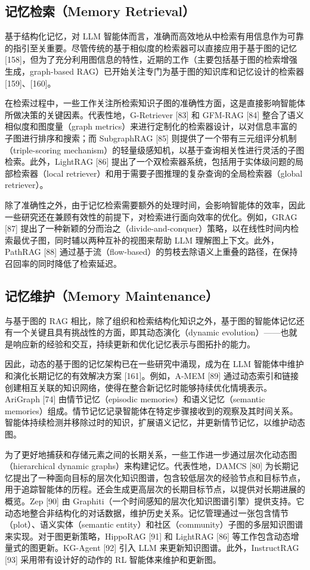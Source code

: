 \documentclass[10pt,UTF8,fontset=fandol]{ctexart}
\begin{document}
\subsection{记忆检索（Memory Retrieval）}

基于结构化记忆，对 LLM 智能体而言，准确而高效地从中检索有用信息作为可靠的指引至关重要。尽管传统的基于相似度的检索器可以直接应用于基于图的记忆 [158]，但为了充分利用图信息的特性，近期的工作（主要包括基于图的检索增强生成，graph-based RAG）已开始关注专门为基于图的知识库和记忆设计的检索器 [159]、[160]。

在检索过程中，一些工作关注所检索知识子图的准确性方面，这是直接影响智能体所做决策的关键因素。代表性地，G-Retriever [83] 和 GFM-RAG [84] 整合了语义相似度和图度量（graph metrics）来进行定制化的检索器设计，以对信息丰富的子图进行排序和搜索；而 SubgraphRAG [85] 则提供了一个带有三元组评分机制（triple-scoring mechanism）的轻量级感知机，以基于查询相关性进行灵活的子图检索。此外，LightRAG [86] 提出了一个双检索器系统，包括用于实体级问题的局部检索器（local retriever）和用于需要子图推理的复杂查询的全局检索器（global retriever）。

除了准确性之外，由于记忆检索需要额外的处理时间，会影响智能体的效率，因此一些研究还在兼顾有效性的前提下，对检索进行面向效率的优化。例如，GRAG [87] 提出了一种新颖的分而治之（divide-and-conquer）策略，以在线性时间内检索最优子图，同时辅以两种互补的视图来帮助 LLM 理解图上下文。此外，PathRAG [88] 通过基于流（flow-based）的剪枝去除语义上重叠的路径，在保持召回率的同时降低了检索延迟。

\subsection{记忆维护（Memory Maintenance）}

与基于图的 RAG 相比，除了组织和检索结构化知识之外，基于图的智能体记忆还有一个关键且具有挑战性的方面，即其动态演化（dynamic evolution）——也就是响应新的经验和交互，持续更新和优化记忆表示与图拓扑的能力。

因此，动态的基于图的记忆架构已在一些研究中涌现，成为在 LLM 智能体中维护和演化长期记忆的有效解决方案 [161]。例如，A-MEM [89] 通过动态索引和链接创建相互关联的知识网络，使得在整合新记忆时能够持续优化情境表示。AriGraph [74] 由情节记忆（episodic memories）和语义记忆（semantic memories）组成。情节记忆记录智能体在特定步骤接收到的观察及其时间关系。智能体持续检测并移除过时的知识，扩展语义记忆，并更新情节记忆，以维护动态图。

为了更好地捕获和存储元素之间的长期关系，一些工作进一步通过层次化动态图（hierarchical dynamic graphs）来构建记忆。代表性地，DAMCS [80] 为长期记忆提出了一种面向目标的层次化知识图谱，包含较低层次的经验节点和目标节点，用于追踪智能体的历程。还会生成更高层次的长期目标节点，以提供对长期进展的概览。Zep [90] 由 Graphiti（一个时间感知的层次化知识图谱引擎）提供支持。它动态地整合非结构化的对话数据，维护历史关系。记忆管理通过一张包含情节（plot）、语义实体（semantic entity）和社区（community）子图的多层知识图谱来实现。对于图更新策略，HippoRAG [91] 和 LightRAG [86] 等工作包含动态增量式的图更新。KG-Agent [92] 引入 LLM 来更新知识图谱。此外，InstructRAG [93] 采用带有设计好的动作的 RL 智能体来维护和更新图。
\end{document}
